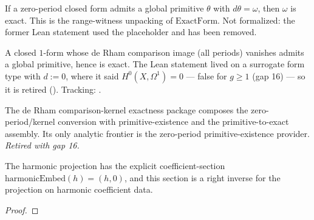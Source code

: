 \begin{lemma}
\label{lem:de-rham-primitive-to-exact-assembly}
If a zero-period closed form admits a global primitive
\(\theta\) with \(d\theta=\omega\), then \(\omega\) is exact. This is
the range-witness unpacking of \(\mathrm{ExactForm}\).
Not formalized: the former Lean statement used the placeholder
 and has been removed.
\end{lemma}

\begin{lemma}
\label{lem:de-rham-comparison-map1-zero-period-primitive-exists-provider}
A closed \(1\)-form whose de Rham comparison image (all periods) vanishes admits
a global primitive, hence is exact. The Lean statement lived on a surrogate form type
with \(d := 0\), where it said \(H^0(X,\Omega^1)=0\) — false for \(g\ge 1\) (gap 16) — so it
is retired ().
Tracking: .
\end{lemma}

\begin{lemma}
\label{lem:de-rham-zero-period-exactness-assembly}
The de Rham comparison-kernel exactness package composes the
zero-period/kernel conversion with primitive-existence and the
primitive-to-exact assembly. Its only analytic frontier is the
zero-period primitive-existence provider. \textit{Retired with gap 16.}
\end{lemma}

\begin{lemma}
\label{lem:hodge-harmonic-embed-bookkeeping}
The harmonic projection has the explicit coefficient-section
\(\mathrm{harmonicEmbed}(h)=(h,0)\), and this section is a right
inverse for the projection on harmonic coefficient data.
\leanok
\end{lemma}
\begin{proof}\leanok\end{proof}

